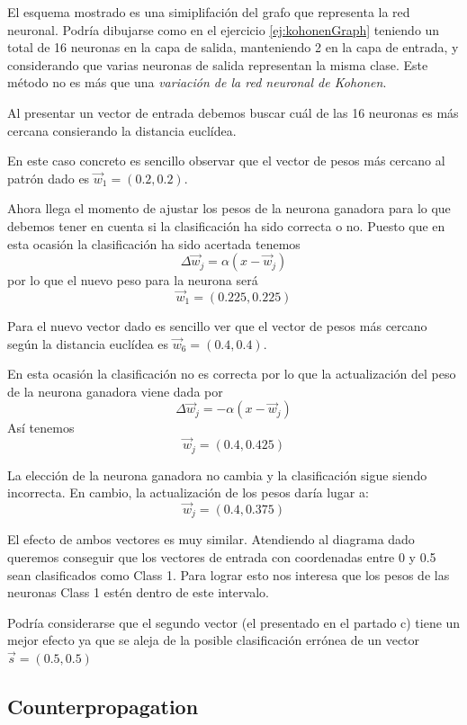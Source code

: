 \begin{problem}[5]
El esquema mostrado es una simiplifación del grafo que representa la red neuronal. Podría dibujarse como en el ejercicio \ref{ej:kohonenGraph} teniendo un total de 16 neuronas en la capa de salida, manteniendo 2 en la capa de entrada, y considerando que varias neuronas de salida representan la misma clase. Este método no es más que una \emph{variación de la red neuronal de Kohonen}.

\spart

Al presentar un vector de entrada debemos buscar cuál de las 16 neuronas es más cercana consierando la distancia euclídea.

En este caso concreto es sencillo observar que el vector de pesos más cercano al patrón dado es $\vec{w}_1=(0.2,0.2)$.

Ahora llega el momento de ajustar los pesos de la neurona ganadora para lo que debemos tener en cuenta si la clasificación ha sido correcta o no. Puesto que en esta ocasión la clasificación ha sido acertada tenemos
\[Δ\vec{w}_{j} = α(x-\vec{w}_j)\]
por lo que el nuevo peso para la neurona será
\[\vec{w}_1 = (0.225,0.225)\]

\spart

Para el nuevo vector dado es sencillo ver que el vector de pesos más cercano según la distancia euclídea es $\vec{w}_6 = (0.4,0.4)$.

En esta ocasión la clasificación no es correcta por lo que la actualización del peso de la neurona ganadora viene dada por
\[Δ\vec{w}_j = -α(x-\vec{w}_j)\]
Así tenemos
\[\vec{w}_j = (0.4, 0.425)\]

\spart

La elección de la neurona ganadora no cambia y la clasificación sigue siendo incorrecta. En cambio, la actualización de los pesos daría lugar a:
\[\vec{w}_j = (0.4, 0.375)\]

\spart

El efecto de ambos vectores es muy similar. Atendiendo al diagrama dado queremos conseguir que los vectores de entrada con coordenadas entre 0 y 0.5 sean clasificados como Class 1. Para lograr esto nos interesa que los pesos de las neuronas Class 1 estén dentro de este intervalo.

Podría considerarse que el segundo vector (el presentado en el partado c) tiene un mejor efecto ya que se aleja de la posible clasificación errónea de un vector $\vec{s}=(0.5,0.5)$

\end{problem}

\subsection{Counterpropagation}

